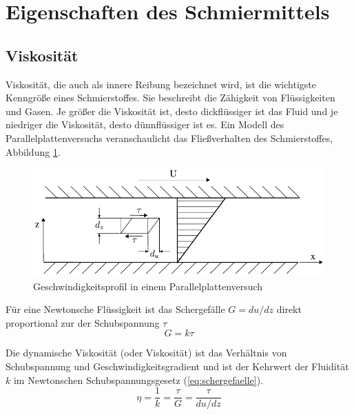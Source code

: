\section{Eigenschaften des Schmiermittels}
\label{sec:eigenschaften_des_schmiermittels}

\subsection*{Viskosität}
\label{sub:viskositaet}
Viskosität, die auch als innere Reibung bezeichnet wird, ist die wichtigste Kenngröße eines Schmierstoffes.
Sie beschreibt die Zähigkeit von Flüssigkeiten und Gasen.
Je größer die Viskosität ist, desto dickflüssiger ist das Fluid und je niedriger die Viskosität, desto dünnflüssiger ist es.
Ein Modell des Parallelplattenversuchs veranschaulicht das Fließverhalten des Schmierstoffes, Abbildung \ref{fig:geschwindigkeitsprofil_parallelplattenversuch}.
\begin{figure}[htb]
    \centering
    \includegraphics[]{./images/parallelplattenversuch.pdf}
    \caption{Geschwindigkeitsprofil in einem Parallelplattenversuch\cite{wisniewski}}
    \label{fig:geschwindigkeitsprofil_parallelplattenversuch}
\end{figure}

Für eine Newtonsche Flüssigkeit ist das Schergefälle $G = du/dz$ direkt proportional zur der Schubspannung $\tau$
\begin{equation}
    G = k  \tau
    \label{eq:schergefaelle}
\end{equation}

Die dynamische Viskosität (oder Viskosität) ist das Verhältnis von Schubspannung und Geschwindigkeitsgradient und ist der Kehrwert der Fluidität $k$ im Newtonschen Schubspannungsgesetz (\ref{eq:schergefaelle}).
\begin{equation}
    \eta = \frac{1}{k} = \frac{\tau}{G} = \frac{\tau}{du/dz}
    \label{eq:dynamische_viskositaet}
\end{equation}


